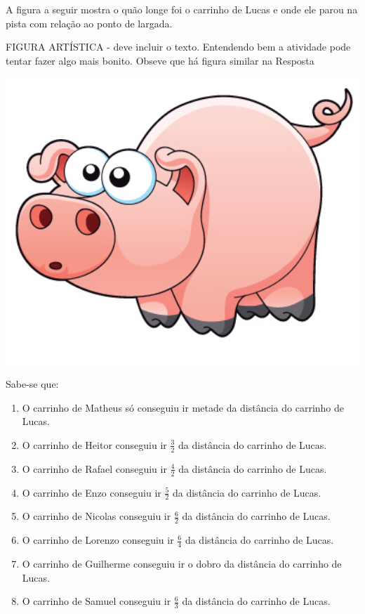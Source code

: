 \documentclass[a4,12pt]{book}
\newcounter{atividade}
\begin{document}
A figura a seguir mostra o quão longe foi o carrinho de Lucas e onde ele parou na pista com relação ao ponto de largada.
\begin{imagem*}[breakable]{}{}   FIGURA ARTÍSTICA - deve incluir o texto. Entendendo bem a atividade pode tentar fazer algo mais bonito. Obseve que há figura similar na Resposta\end{imagem*}
\includegraphics[width=600pt, keepaspectratio]{pig}

Sabe-se que:

\begin{enumerate} [\quad a)] %
  \item     O carrinho de Matheus só conseguiu ir metade da distância do carrinho de Lucas.
  \item     O carrinho de Heitor conseguiu ir     $\frac{3}{2}$     da distância do carrinho de Lucas.
  \item     O carrinho de Rafael conseguiu ir     $\frac{4}{2}$     da distância do carrinho de Lucas.
  \item     O carrinho de Enzo conseguiu ir     $\frac{5}{2}$     da distância do carrinho de Lucas.
  \item     O carrinho de Nicolas conseguiu ir     $\frac{6}{2}$     da distância do carrinho de Lucas.
  \item     O carrinho de Lorenzo conseguiu ir     $\frac{6}{4}$     da distância do carrinho de Lucas.
  \item     O carrinho de Guilherme conseguiu ir o dobro da distância do carrinho de Lucas.
  \item     O carrinho de Samuel conseguiu ir     $\frac{6}{3}$     da distância do carrinho de Lucas.
\end{enumerate} %
\end{document}
